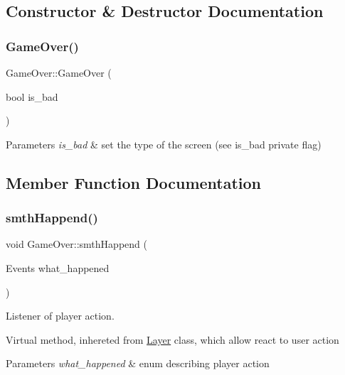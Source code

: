 \subsection{Constructor \& Destructor Documentation}
\mbox{\label{class_game_over_a3eb13fd94a63ff6dace1e1265b0c535d}} 
\subsubsection{\texorpdfstring{Game\+Over()}{GameOver()}}
{\footnotesize\ttfamily Game\+Over\+::\+Game\+Over (\begin{DoxyParamCaption}\item[{bool}]{is\+\_\+bad }\end{DoxyParamCaption})}


\begin{DoxyParams}{Parameters}
{\em is\+\_\+bad} & set the type of the screen (see is\+\_\+bad private flag) \\
\hline
\end{DoxyParams}


\subsection{Member Function Documentation}
\mbox{\label{class_game_over_a919e7ac37c476bf288f732f9a8106016}} 
\subsubsection{\texorpdfstring{smth\+Happend()}{smthHappend()}}
{\footnotesize\ttfamily void Game\+Over\+::smth\+Happend (\begin{DoxyParamCaption}\item[{Events}]{what\+\_\+happened }\end{DoxyParamCaption})\hspace{0.3cm}{\ttfamily [virtual]}}



Listener of player action. 

Virtual method, inhereted from \hyperlink{class_layer}{Layer} class, which allow react to user action 
\begin{DoxyParams}{Parameters}
{\em what\+\_\+happened} & enum describing player action \\
\hline
\end{DoxyParams}


